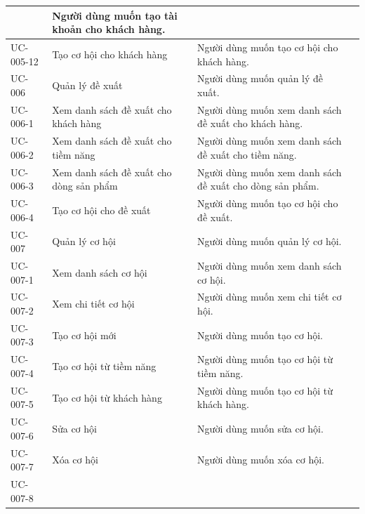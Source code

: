 \documentclass[12pt,a4paper]{article}
\begin{document}
\begin{center}
\begin{longtable}{|p{2.5cm}|p{4.5cm}|p{7.5cm}|c|}
            & Người dùng muốn tạo tài khoản cho khách hàng.
            \\ \hline
            UC-005-12
            & Tạo cơ hội cho khách hàng
            & Người dùng muốn tạo cơ hội cho khách hàng.
            \\ \hline
            UC-006
            & Quản lý đề xuất
            & Người dùng muốn quản lý đề xuất.
            \\ \hline
            UC-006-1
            & Xem danh sách đề xuất cho khách hàng
            & Người dùng muốn xem danh sách đề xuất cho khách hàng.
            \\ \hline
            UC-006-2
            & Xem danh sách đề xuất cho tiềm năng
            & Người dùng muốn xem danh sách đề xuất cho tiềm năng.
            \\ \hline
            UC-006-3
            & Xem danh sách đề xuất cho dòng sản phẩm
            & Người dùng muốn xem danh sách đề xuất cho dòng sản phẩm.
            \\ \hline
            UC-006-4
            & Tạo cơ hội cho đề xuất
            & Người dùng muốn tạo cơ hội cho đề xuất.
            \\ \hline
            UC-007
            & Quản lý cơ hội
            & Người dùng muốn quản lý cơ hội.
            \\ \hline
            UC-007-1
            & Xem danh sách cơ hội
            & Người dùng muốn xem danh sách cơ hội.
            \\ \hline
            UC-007-2
            & Xem chi tiết cơ hội
            & Người dùng muốn xem chi tiết cơ hội.
            \\ \hline
            UC-007-3
            & Tạo cơ hội mới
            & Người dùng muốn tạo cơ hội.
            \\ \hline
            UC-007-4
            & Tạo cơ hội từ tiềm năng
            & Người dùng muốn tạo cơ hội từ tiềm năng.
            \\ \hline
            UC-007-5
            & Tạo cơ hội từ khách hàng
            & Người dùng muốn tạo cơ hội từ khách hàng.
            \\ \hline
            UC-007-6
            & Sửa cơ hội
            & Người dùng muốn sửa cơ hội.
            \\ \hline
            UC-007-7
            & Xóa cơ hội
            & Người dùng muốn xóa cơ hội.
            \\ \hline
            UC-007-8

\end{longtable}
\end{center}
\end{document}
